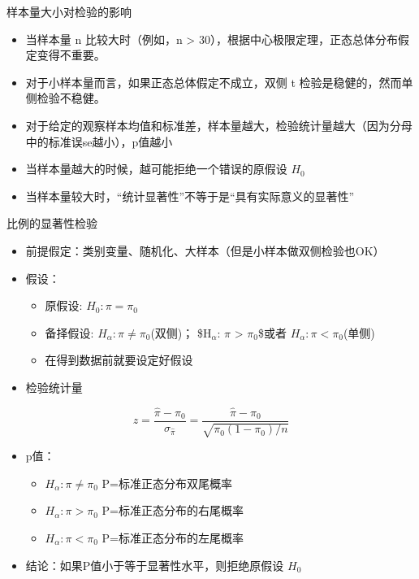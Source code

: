 \documentclass[presentation]{beamer}
\begin{document}
\begin{frame}[label={sec:org964eb13}]{样本量大小对检验的影响}
\begin{itemize}
\item 当样本量 n 比较大时（例如，n > 30），根据中心极限定理，正态总体分布假定变得不重要。

\item 对于小样本量而言，如果正态总体假定不成立，双侧 t 检验是稳健的，然而单侧检验不稳健。

\item 对于给定的观察样本均值和标准差，样本量越大，检验统计量越大（因为分母中的标准误se越小），p值越小

\item 当样本量越大的时候，越可能拒绝一个错误的原假设 \(H_0\)

\item 当样本量较大时，“统计显著性”不等于是“具有实际意义的显著性”
\end{itemize}
\end{frame}

\begin{frame}[label={sec:orgde0cfb3}]{比例的显著性检验}
\begin{itemize}
\item 前提假定：类别变量、随机化、大样本（但是小样本做双侧检验也OK）

\item 假设：
\begin{itemize}
\item 原假设: \(H_0: \pi=\pi_0\)
\item 备择假设: \(H_{\alpha}: \pi \neq \pi_0\)(双侧)； \$H\(_{\alpha}\): \(\pi\) > \(\pi_{\text{0}}\)\$或者 \(H_{\alpha}: \pi < \pi_0\)(单侧)
\item 在得到数据前就要设定好假设
\end{itemize}

\item 检验统计量
\end{itemize}

$$z=\frac{\hat \pi-\pi_0}{\sigma_{\hat \pi}}=\frac{\hat \pi-\pi_0}{\sqrt{\pi_0(1-\pi_0)/n}}$$
\begin{itemize}
\item p值：
\begin{itemize}
\item \(H_{\alpha}: \pi \neq \pi_0\) P=标准正态分布双尾概率
\item \(H_{\alpha}: \pi > \pi_0\) P=标准正态分布的右尾概率
\item \(H_{\alpha}: \pi < \pi_0\) P=标准正态分布的左尾概率
\end{itemize}

\item 结论：如果P值小于等于显著性水平，则拒绝原假设 \(H_0\)
\end{itemize}
\end{frame}
\end{document}
